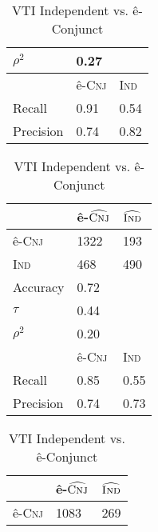 \begin{table}[H]
\begin{floatrow}[2]
{\begin{tabular}{lll}
$\rho^{2}$           & 0.27               &                       \\
                     \midrule
                     \midrule
                     & ê-\textsc{Cnj}       & \textsc{Ind}           \\
Recall               & 0.91               & 0.54                  \\
Precision            & 0.74               & 0.82 \\
                \bottomrule
                \end{tabular}}
    {\caption{VAI Independent vs. ê-Conjunct}
      \label{vaiivcms}}
  \end{floatrow}
  \vspace*{1cm}
  \begin{floatrow}[2]
    \ttabbox%
    {                \begin{tabular}{lll}
                \toprule
                     & ê-$\widehat{\textsc{Cnj}}$ & $\widehat{\textsc{Ind}}$ \\
                \midrule
ê-\textsc{Cnj}         & 1322               & 193                    \\
\textsc{Ind}           & 468                & 490                    \\
                     \midrule
                     \midrule
Accuracy             & 0.72               &                       \\
$\tau$               & 0.44               &                       \\
$\rho^{2}$           & 0.20               &                       \\
                     \midrule
                     \midrule
                     & ê-\textsc{Cnj}       & \textsc{Ind}           \\
Recall               & 0.85               & 0.55                  \\
Precision            & 0.74               & 0.73 \\
                \bottomrule
                \end{tabular}}
    {\caption{VTI Independent vs. ê-Conjunct}
      \label{vtiivcms}}
    \hfill%
    \ttabbox%
        {                \begin{tabular}{lll}
                \toprule
                     & ê-$\widehat{\textsc{Cnj}}$ & $\widehat{\textsc{Ind}}$ \\
                \midrule
ê-\textsc{Cnj}         & 1083               & 269                    \\

\end{tabular}}
\end{floatrow}
\end{table}
